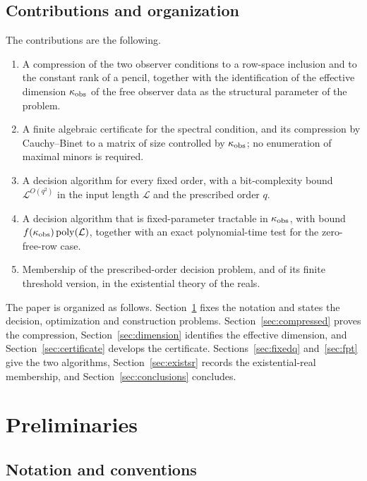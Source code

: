 \subsection{Contributions and organization}\label{sec:contrib}

The contributions are the following.

\begin{enumerate}
\item A compression of the two observer conditions to a row-space inclusion and to the
constant rank of a pencil, together with the identification of the effective dimension
$\kappa_{\rm obs}$ of the free observer data as the structural parameter of the problem.
\item A finite algebraic certificate for the spectral condition, and its compression by
Cauchy--Binet to a matrix of size controlled by $\kappa_{\rm obs}$; no enumeration of
maximal minors is required.
\item A decision algorithm for every fixed order, with a bit-complexity bound
$\mathcal L^{O(q^2)}$ in the input length $\mathcal L$ and the prescribed order $q$.
\item A decision algorithm that is fixed-parameter tractable in $\kappa_{\rm obs}$, with
bound $f(\kappa_{\rm obs})\operatorname{poly}(\mathcal L)$, together with an exact
polynomial-time test for the zero-free-row case.
\item Membership of the prescribed-order decision problem, and of its finite threshold
version, in the existential theory of the reals.
\end{enumerate}

The paper is organized as follows. Section~\ref{sec:prelim} fixes the notation and states
the decision, optimization and construction problems. Section~\ref{sec:compressed} proves
the compression, Section~\ref{sec:dimension} identifies the effective dimension, and
Section~\ref{sec:certificate} develops the certificate. Sections~\ref{sec:fixedq}
and~\ref{sec:fpt} give the two algorithms, Section~\ref{sec:existsr} records the
existential-real membership, and Section~\ref{sec:conclusions} concludes.

\section{Preliminaries}\label{sec:prelim}

\subsection{Notation and conventions}\label{sec:notation}

